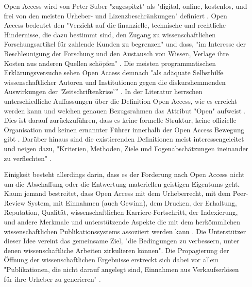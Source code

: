 Open Access wird von Peter Suber "zugespitzt" \cite{naeder_2010_open} als "digital, online, kostenlos, und frei von den meisten Urheber- und Lizenzbeschränkungen" \cite{suber_2012_open} definiert \cite{Adema_2014_open_access}. Open Access bedeutet den "Verzicht auf die finanzielle, technische und rechtliche Hindernisse, die dazu bestimmt sind, den Zugang zu wissenschaftlichen Forschungsartikel für zahlende Kunden zu begrenzen" und dass, "im Interesse der Beschleunigung der Forschung und den Austausch von Wissen, Verlage ihre Kosten aus anderen Quellen schöpfen" \cite{Suber_2002}. Die meisten programmatischen Erklärungsversuche sehen Open Access demnach "als adäquate Selbsthilfe wissenschaftlicher Autoren und Institutionen gegen die diskurshemmenden Auswirkungen der 'Zeitschriftenkrise'” \cite{naeder_2010_open}. In der Literatur herrschen unterschiedliche Auffassungen über die Definition Open Access, wie es erreicht werden kann und welchen genauen Bezugsrahmen das Attribut "Open" aufweist \cite{Adema_2014_open_access} \cite{cite:17}. Dies ist darauf zurückzuführen, dass es keine formelle Struktur, keine offizielle Organisation und keinen ernannter Führer innerhalb der Open Access Bewegung gibt \cite{poynder_2011_suber}. Darüber hinaus sind die existierenden Definitionen meist interessengeleitet und neigen dazu, "Kriterien, Methoden, Ziele und Fogenabschätzungen ineinander zu verflechten" \cite{naeder_2010_open}.

Einigkeit besteht allerdings darin, dass es der Forderung nach Open Access nicht um die Abschaffung oder die Entwertung materiellen geistigen Eigentums geht. Kaum jemand bestreitet, dass Open Access mit dem Urheberrecht, mit dem Peer-Review System, mit Einnahmen (auch Gewinn), dem Drucken, der Erhaltung, Reputation, Qualität, wissenschaftlichen Karriere-Fortschritt, der Indexierung, und andere Merkmale und unterstützende Aspekte die mit dem herkömmlichen wissenschaftlichen Publikationssystems assoziiert werden kann \cite{suber_2015}. Die Unterstützer dieser Idee vereint das gemeinsame Ziel, "die Bedingungen zu verbessern, unter denen wissenschaftliche Arbeiten zirkulieren können"\cite{Adema_2014_open_access}. Die Propagierung der Öffnung der wissenschaftlichen Ergebnisse erstreckt sich dabei vor allem "Publikationen, die nicht darauf angelegt sind, Einnahmen aus Verkaufserlösen für ihre Urheber zu generieren" \cite{muller_2010_open}.

